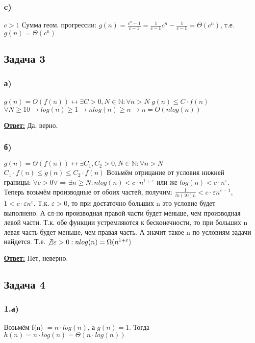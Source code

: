 \documentclass[a4paper,14pt]{article} %
\begin{document}
\subsubsection*{c)} $c > 1$
\newline
Сумма геом. прогрессии: $g(n) = \frac{c^n - 1}{c-1} = \frac{1}{c-1} c^n - \frac{1}{c-1} = \Theta(c^n)$, т.е. $g(n) = \Theta(c^n)$

\subsection{Задача 3}
\subsubsection*{а)} 
$g(n) = O(f(n)) \leftrightarrow \exists C > 0, N \in \mathds{N} : \forall n > N$ $g(n) \leq C \cdot f(n)$
\newline
$\forall N \geq 10 \rightarrow log(n) \geq 1 \rightarrow nlog(n) \geq n \rightarrow n = O(nlog(n))$

\underline{\textbf{Ответ:}} Да, верно.

\subsubsection*{б)}
$g(n) = \Theta(f(n)) \leftrightarrow \exists C_1, C_2 > 0, N \in \mathds{N} : \forall n > N$ $C_1 \cdot f(n) \leq g(n) \leq C_2 \cdot f(n)$
\newline
Возьмём отрицание от условия нижней границы: $\forall c > 0 \forall \Rightarrow \exists n \geq N : nlog(n) < c \cdot n^{1+\varepsilon}$ или же $log(n) < c \cdot n^{\varepsilon}$.
Теперь возьмём производные от обоих частей, получим: $\frac{1}{ln(10)n} < c \cdot \varepsilon n^{\varepsilon - 1}$, $1 < c \cdot \varepsilon n^{\varepsilon}$. Т.к. $\varepsilon > 0$,
то при достаточно больших n это условие будет выполнено. А сл-но производная правой части будет меньше, чем производная левой части. Т.к. обе функции устремляются к бесконечности, то при больших n левая часть будет меньше, чем правая часть. А значит такое n по условиям задачи найдется. 
Т.е. $\not\exists \varepsilon > 0 : nlog(n) = \Omega(n^{1+\varepsilon})$

\underline{\textbf{Ответ:}} Нет, неверно.

\subsection{Задача 4}
\subsubsection*{1.а)}
Возьмём f(n) $= n \cdot log(n)$, а $g(n) = 1$. Тогда $h(n) = n \cdot log(n) = \Theta(n \cdot log(n))$
\end{document}

